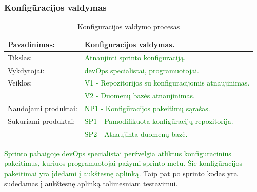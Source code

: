 \documentclass{VUMIFPSkursinis}
\begin{document}
	\subsubsection{Konfigūracijos valdymas}
	\begin{center}
		\begin{table}[ht]
			\caption{Konfigūracijos valdymo procesas}
			\begin{tabular}{ | l | l | }
				\hline
				Pavadinimas:         & Konfigūracijos valdymas.				\\ \hline
				Tikslas:             & \textcolor{green}{Atnaujinti sprinto konfigūraciją.}			\\ \hline
				Vykdytojai:          & \textcolor{green}{devOps specialistai, programuotojai.}			\\ \hline
				Veiklos:             & \textcolor{green}{V1 - Repozitorijos su konfigūracijomis atnaujinimas.}	\\
				                     & \textcolor{green}{V2 - Duomenų bazės atnaujinimas.	}		\\ \hline
				Naudojami produktai: & \textcolor{green}{NP1 - Konfigūracijos pakeitimų sąrašas.	}	\\ \hline
				Sukuriami produktai: & \textcolor{green}{SP1 - Pamodifikuota konfigūracijų repozitorija. }	\\
				                     & \textcolor{green}{SP2 - Atnaujinta duomenų bazė. }			\\ \hline
			\end{tabular}
		\end{table}
	\end{center}
		\textcolor{green}{Sprinto pabaigoje devOps specialistai peržvelgia atliktus konfigūracinius pakeitimus, kuriuos programuotojai pažymi sprinto metu.
		Šie konfigūracijos pakeitimai yra įdedami į aukštesnę aplinką.} Taip pat po sprinto kodas yra sudedamas į aukštesnę aplinką tolimesniam testavimui.
\end{document}
